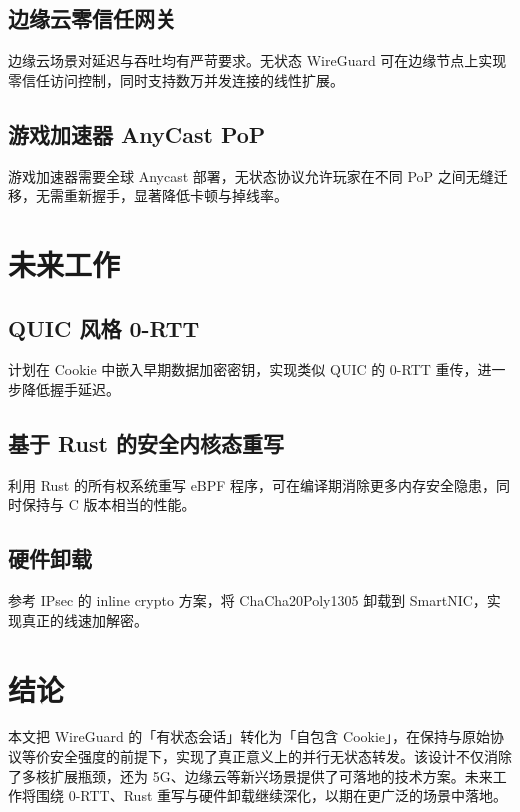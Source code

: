 \section{边缘云零信任网关}
边缘云场景对延迟与吞吐均有严苛要求。无状态 WireGuard 可在边缘节点上实现零信任访问控制，同时支持数万并发连接的线性扩展。\par
\section{游戏加速器 AnyCast PoP}
游戏加速器需要全球 Anycast 部署，无状态协议允许玩家在不同 PoP 之间无缝迁移，无需重新握手，显著降低卡顿与掉线率。\par
\chapter{未来工作}
\section{QUIC 风格 0-RTT}
计划在 Cookie 中嵌入早期数据加密密钥，实现类似 QUIC 的 0-RTT 重传，进一步降低握手延迟。\par
\section{基于 Rust 的安全内核态重写}
利用 Rust 的所有权系统重写 eBPF 程序，可在编译期消除更多内存安全隐患，同时保持与 C 版本相当的性能。\par
\section{硬件卸载}
参考 IPsec 的 inline crypto 方案，将 ChaCha20Poly1305 卸载到 SmartNIC，实现真正的线速加解密。\par
\chapter{结论}
本文把 WireGuard 的「有状态会话」转化为「自包含 Cookie」，在保持与原始协议等价安全强度的前提下，实现了真正意义上的并行无状态转发。该设计不仅消除了多核扩展瓶颈，还为 5G、边缘云等新兴场景提供了可落地的技术方案。未来工作将围绕 0-RTT、Rust 重写与硬件卸载继续深化，以期在更广泛的场景中落地。\par
